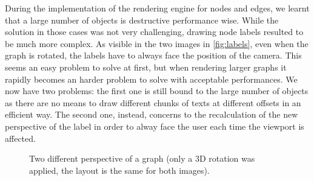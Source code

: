During the implementation of the rendering engine for nodes and edges, we learnt that a large number of objects is destructive performance wise. While the solution in those cases was not very challenging, drawing node labels resulted to be much more complex. As visible in the two images in \vref{fig:labels}, even when the graph is rotated, the labels have to always face the position of the camera. This seems an easy problem to solve at first, but when rendering larger graphs it rapidly becomes an harder problem to solve with acceptable performances. We now have two problems: the first one is still bound to the large number of objects as there are no means to draw different chunks of texts at different offsets in an efficient way. The second one, instead, concerns to the recalculation of the new perspective of the label in order to alway face the user each time the viewport is affected.

\begin{figure}
	\hfill
  \caption[Two different perspectives of the same graph.]{Two different perspective of a graph (only a 3D rotation was applied, the layout is the same for both images).}%
  \label{fig:labels}
\end{figure}

